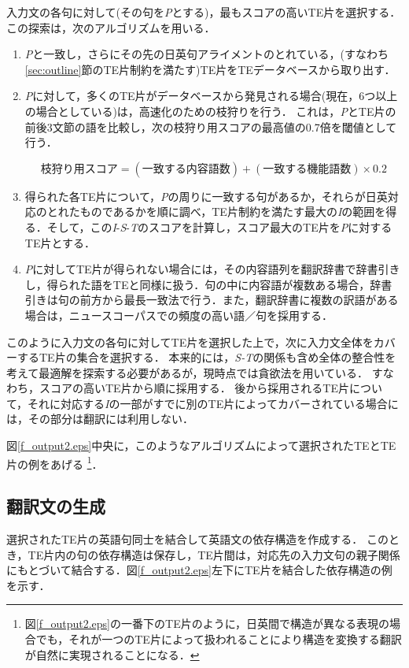 \documentclass{nlp}
\begin{document}
入力文の各句に対して(その句を{\it P}とする)，最もスコアの高いTE片を選択する．
この探索は，次のアルゴリズムを用いる．

\begin{enumerate}
\item {\it P}と一致し，さらにその先の日英句アライメントのとれている，(すなわち\ref{sec:outline}節のTE片制約を満たす)TE片をTEデータベースから取り出す．
\item {\it P}に対して，多くのTE片がデータベースから発見される場合(現在，6つ以上の場合としている)は，高速化のための枝狩りを行う．
これは，{\it P}とTE片の前後3文節の語を比較し，次の枝狩り用スコアの最高値の0.7倍を閾値として行う．

\[
枝狩り用スコア = (一致する内容語数) + (一致する機能語数) \times 0.2
\]
\item 得られた各TE片について，{\it P}の周りに一致する句があるか，それらが日英対応のとれたものであるかを順に調べ，TE片制約を満たす最大の{\it I}の範囲を得る．そして，この{\it I}-{\it S}-{\it T}のスコアを計算し，スコア最大のTE片を{\it P}に対するTE片とする．

\item {\it P}に対してTE片が得られない場合には，その内容語列を翻訳辞書で辞書引きし，得られた語をTEと同様に扱う．句の中に内容語が複数ある場合，辞書引きは句の前方から最長一致法で行う．また，翻訳辞書に複数の訳語がある場合は，ニュースコーパスでの頻度の高い語／句を採用する．
\end{enumerate}

このように入力文の各句に対してTE片を選択した上で，次に入力文全体をカバーするTE片の集合を選択する．
本来的には，{\it S-T}の関係も含め全体の整合性を考えて最適解を探索する必要があるが，現時点では貪欲法を用いている．
すなわち，スコアの高いTE片から順に採用する．
後から採用されるTE片について，それに対応する{\it I}の一部がすでに別のTE片によってカバーされている場合には，その部分は翻訳には利用しない．

図\ref{f_output2.eps}中央に，このようなアルゴリズムによって選択されたTEとTE片の例をあげる
\footnote{ 図\ref{f_output2.eps}の一番下のTE片のように，日英間で構造が異なる表現の場合でも，それが一つのTE片によって扱われることにより構造を変換する翻訳が自然に実現されることになる．}．

\subsection{翻訳文の生成}

選択されたTE片の英語句同士を結合して英語文の依存構造を作成する．
このとき，TE片内の句の依存構造は保存し，TE片間は，対応先の入力文句の親子関係にもとづいて結合する．図\ref{f_output2.eps}左下にTE片を結合した依存構造の例を示す．
\end{document}
